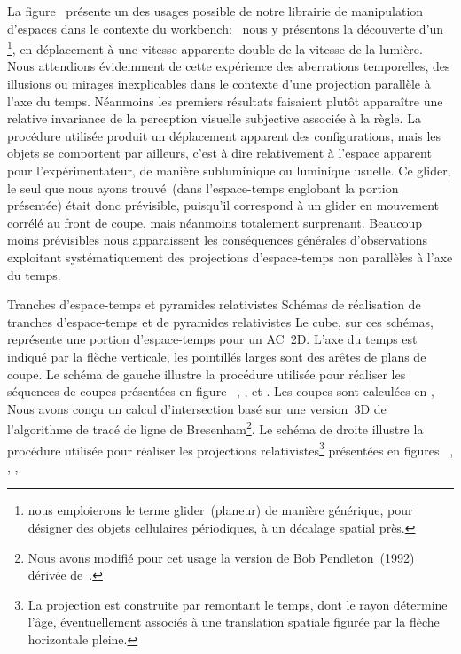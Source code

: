 \noindent La figure~ présente un des usages
possible de notre librairie de manipulation d'espaces dans le
contexte du workbench:~%
nous y présentons la découverte d'un \footnote{%
  nous emploierons le terme glider~(planeur) de manière générique, \ie
  pour désigner des objets cellulaires périodiques, à un décalage spatial près.}, %
en déplacement à une vitesse apparente double de la
vitesse de la lumière. %
Nous attendions évidemment de cette expérience des aberrations
temporelles, des illusions ou mirages inex\-plicables dans le contexte
d'une projection parallèle à l'axe du temps. %
Néanmoins les premiers résultats faisaient plutôt apparaître une
relative invariance de la perception visuelle subjective associée à la
règle. %
La procédure utilisée produit un déplacement apparent des
configurations, mais les objets se comportent par ailleurs, c'est à
dire relativement à l'espace apparent pour l'expérimentateur, de
manière subluminique ou luminique usuelle. %
Ce glider, le seul que nous ayons trouvé~(dans l'espace-temps
englobant la portion présentée) était donc prévisible, puisqu'il
correspond à un glider en mouvement corrélé au front de coupe, mais
néanmoins totalement surprenant. %
Beaucoup moins prévisibles nous apparaissent les conséquences
générales d'observations exploitant systématiquement des projections
d'espace-temps non parallèles à l'axe du temps.

%
{Tranches d'espace-temps et pyramides relativistes}%
{Schémas de réalisation de tranches d'espace-temps et de pyramides relativistes}%
{Le cube, sur ces schémas, représente une portion d'espace-temps pour
  un AC~2D. %
  L'axe du temps est indiqué par la flèche verticale, %
  les pointillés larges sont des arêtes de plans de coupe. %
  Le schéma de gauche illustre la procédure utilisée pour réaliser les
  séquences de coupes présentées en figure~%
  , %
  , %
  et . %
  Les coupes sont calculées en , %
  Nous avons conçu un calcul d'intersection basé sur une
  version~3D de l'algorithme de tracé de ligne de Bresenham\footnote{%
    Nous avons modifié pour cet usage la version de Bob
    Pendleton~(1992) dérivée de~\cite{Heckbert90}.}. %
  Le schéma de droite illustre la procédure utilisée pour réaliser les
  projections relativistes\footnote{%
    La projection est construite par 
    remontant le temps, dont le rayon détermine l'âge, éventuellement
    associés à une translation spatiale figurée par la flèche horizontale
    pleine.} %
  présentées en figures~%
  , %
  , %
  , %
  }

